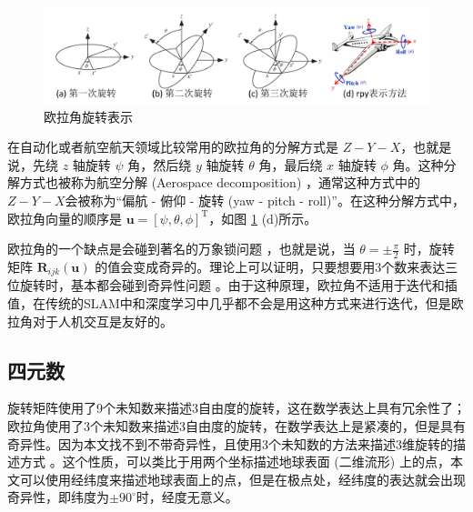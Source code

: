 \begin{figure}
    \centering
    \includegraphics[width=\textwidth]{images/rotation.pdf}
    \caption{欧拉角旋转表示}
    \label{fig:rotation}
    \vspace{-0.5cm}
\end{figure}

在自动化或者航空航天领域比较常用的欧拉角的分解方式是 $Z-Y-X$，也就是说，先绕 $z$ 轴旋转 $\psi$ 角，然后绕 $y$ 轴旋转 $\theta$ 角，最后绕 $x$ 轴旋转 $\phi$ 角。这种分解方式也被称为航空分解 (Aerospace decomposition) ，通常这种方式中的$Z-Y-X$会被称为“偏航 - 俯仰 - 旋转 (yaw - pitch - roll)”。在这种分解方式中，欧拉角向量的顺序是 $\boldsymbol{u} = [\psi, \theta, \phi]^\text{T}$，如图 \ref{fig:rotation} (d)所示。

欧拉角的一个缺点是会碰到著名的万象锁问题\cite{vsenk2006rotation} ，也就是说，当 $\theta = \pm \frac{\pi}{2}$ 时，旋转矩阵 $\boldsymbol{R}_{ijk}(\boldsymbol{u})$ 的值会变成奇异的。理论上可以证明，只要想要用3个数来表达三位旋转时，基本都会碰到奇异性问题\cite{stuelpnagel1964parametrization} 。由于这种原理，欧拉角不适用于迭代和插值，在传统的SLAM中和深度学习中几乎都不会是用这种方式来进行迭代，但是欧拉角对于人机交互是友好的。

\subsection{四元数}
旋转矩阵使用了9个未知数来描述3自由度的旋转，这在数学表达上具有冗余性了；欧拉角使用了3个未知数来描述3自由度的旋转，在数学表达上是紧凑的，但是具有奇异性。因为本文找不到不带奇异性，且使用3个未知数的方法来描述3维旋转的描述方式\cite{stuelpnagel1964parametrization} 。这个性质，可以类比于用两个坐标描述地球表面 (二维流形) 上的点，本文可以使用经纬度来描述地球表面上的点，但是在极点处，经纬度的表达就会出现奇异性，即纬度为$\pm 90^{\circ}$时，经度无意义。

